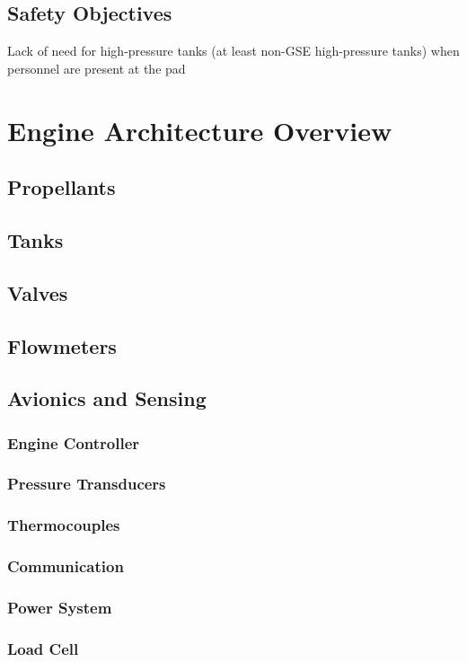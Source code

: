 \documentclass[12pt, letterpaper]{article}
\begin{document}
\subsection{Safety Objectives}
Lack of need for high-pressure tanks (at least non-GSE high-pressure tanks) when personnel are present at the pad

\section{Engine Architecture Overview}
\subsection{Propellants}
\subsection{Tanks}
\subsection{Valves}
\subsection{Flowmeters}
\subsection{Avionics and Sensing}
\subsubsection{Engine Controller}
\subsubsection{Pressure Transducers}
\subsubsection{Thermocouples}
\subsubsection{Communication}
\subsubsection{Power System}
\subsubsection{Load Cell}
\end{document}
